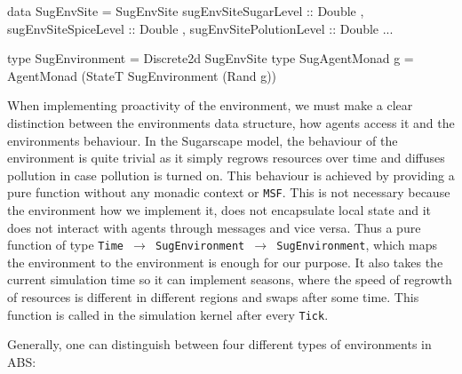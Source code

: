 \begin{HaskellCode}
data SugEnvSite = SugEnvSite 
  { sugEnvSiteSugarLevel    :: Double
  , sugEnvSiteSpiceLevel    :: Double
  , sugEnvSitePolutionLevel :: Double
  ...
  }

type SugEnvironment  = Discrete2d SugEnvSite
type SugAgentMonad g = AgentMonad (StateT SugEnvironment (Rand g))
\end{HaskellCode}

When implementing proactivity of the environment, we must make a clear distinction between the environments data structure, how agents access it and the environments behaviour. In the Sugarscape model, the behaviour of the environment is quite trivial as it simply regrows resources over time and diffuses pollution in case pollution is turned on. This behaviour is achieved by providing a pure function without any monadic context or \texttt{MSF}. This is not necessary because the environment how we implement it, does not encapsulate local state and it does not interact with agents through messages and vice versa. Thus a pure function of type \texttt{Time $\rightarrow$ SugEnvironment $\rightarrow$ SugEnvironment}, which maps the environment to the environment is enough for our purpose. It also takes the current simulation time so it can implement seasons, where the speed of regrowth of resources is different in different regions and swaps after some time. This function is called in the simulation kernel after every \texttt{Tick}.

\medskip

Generally, one can distinguish between four different types of environments in ABS:

